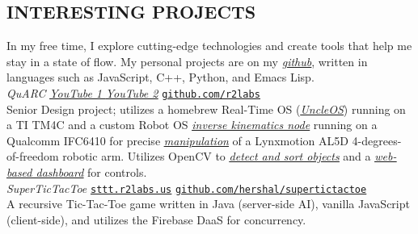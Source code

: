 \documentclass[margin]{res}
\begin{document}
\begin{resume}
  \section{INTERESTING PROJECTS}
  In my free time, I explore cutting-edge technologies and create tools that
  help me stay in a state of flow. My personal projects are on my
  \href{https://github.com/hershal}{\ul{\sl{github}}}, written in languages such
  as JavaScript, C++, Python, and Emacs Lisp.
  \vspace{0.5em}\\
  {\sl QuARC} \hfill \href{https://www.youtube.com/watch?v=MEig9XBwUmU}{\sl
    \ul{YouTube 1}}\quad \href{https://www.youtube.com/watch?v=ggipd0oqxwY}{\sl
    \ul{YouTube 2}}\quad
  \href{https://github.com/r2labs}{\ul{\texttt{github.com/r2labs}}} \\
  Senior Design project; utilizes a homebrew Real-Time OS
  (\href{https://github.com/r2labs/uncleos}{\sl \ul{UncleOS}}) running on a TI
  TM4C and a custom Robot OS
  \href{https://github.com/r2labs/quarc-inverse-kinematics}{\sl \ul{inverse
      kinematics node}} running on a Qualcomm IFC6410 for precise
  \href{https://github.com/r2labs/quarc-user-interface}{\sl \ul{manipulation}}
  of a Lynxmotion AL5D 4-degrees-of-freedom robotic arm. Utilizes OpenCV to
  \href{https://github.com/r2labs/quarc-vision}{\sl \ul{detect and sort
      objects}} and a \href{https://github.com/r2labs/quarc-web-interface}{\sl
    \ul{web-based dashboard}} for controls.
  \vspace{0.5em}\\
  {\sl SuperTicTacToe} \hfill
  \href{http://sttt.r2labs.us}{\ul{\texttt{sttt.r2labs.us}}}\quad
  \href{https://github.com/hershal/supertictactoe}{\ul{\texttt{github.com/hershal/supertictactoe}}} \\
  A recursive Tic-Tac-Toe game written in Java (server-side AI), vanilla
  JavaScript (client-side), and utilizes the Firebase DaaS for concurrency.


\end{resume}
\end{document}
